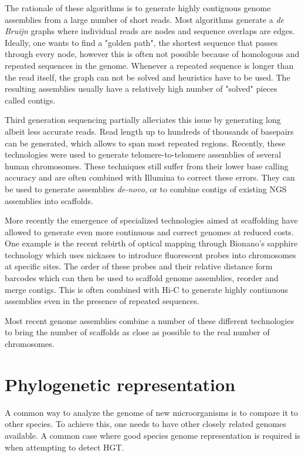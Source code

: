 The rationale of these algorithms is to generate highly contiguous genome assemblies from a large number of short reads. Most algorithms generate a \textit{de Bruijn} graphs where individual reads are nodes and sequence overlaps are edges. Ideally, one wants to find a "golden path", the shortest sequence that passes through every node, however this is often not possible because of homologous and repeated sequences in the genome. Whenever a repeated sequence is longer than the read itself, the graph can not be solved and heuristics have to be used. The resulting assemblies usually have a relatively high number of "solved" pieces called \Gls{contig}s.

Third generation sequencing partially alleviates this issue by generating long albeit less accurate reads. Read length up to hundreds of thousands of basepairs can be generated, which allows to span most repeated regions. Recently, these technologies were used to generate telomere-to-telomere assemblies of several human chromosomes. These techniques still suffer from their lower base calling accuracy and are often combined with Illumina to correct these errors. They can be used to generate assemblies \textit{de-novo}, or to combine contigs of existing NGS assemblies into \Gls{scaffold}s.

More recently the emergence of specialized technologies aimed at scaffolding have allowed to generate even more continuous and correct genomes at reduced costs. One example is the recent rebirth of optical mapping through Bionano's sapphire technology which uses nickases to introduce fluorescent probes into chromosomes at specific sites. The order of these probes and their relative distance form barcodes which can then be used to scaffold genome assemblies, reorder and merge contigs. This is often combined with Hi-C to generate highly continuous assemblies even in the presence of repeated sequences.

Most recent genome assemblies combine a number of these different technologies to bring the number of scaffolds as close as possible to the real number of chromosomes.

\section{Phylogenetic representation}

A common way to analyze the genome of new microorganisms is to compare it to other species. To achieve this, one needs to have other closely related genomes available. A common case where good species genome representation is required is when attempting to detect \acrshort{HGT}.

